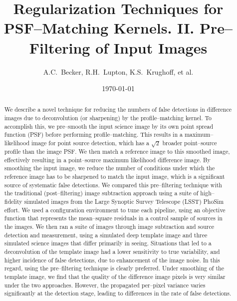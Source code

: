 \documentclass[iop]{emulateapj}
\begin{document}
\title{Regularization Techniques for PSF--Matching Kernels. II. Pre--Filtering of Input Images}

\author{
A.C.~Becker,
R.H.~Lupton,
K.S.~Krughoff,
et al.
}

\date{\today}

\begin{abstract}

We describe a novel technique for reducing the numbers of false detections in difference images due to deconvolution (or sharpening) by the profile--matching kernel.
To accomplish this, we pre--smooth the input science image by its own point spread function (PSF) before performing profile--matching.
This results in a maximum--likelihood image for point source detection, which has a $\sqrt{2}$ broader point--source profile than the image PSF.
We then match a reference image to this smoothed image, effectively resulting in a point--source maximum likelihood difference image.
By smoothing the input image, we reduce the number of conditions under which the reference image has to be sharpened to match the input image, which is a significant source of systematic false detections.
We compared this pre--filtering technique with the traditional (post--filtering) image subtraction approach using a suite of high--fidelity simulated images from the Large Synoptic Survey Telescope (LSST) PhoSim effort.
We used a configuration environment to tune each pipeline, using an objective function that represents the mean--square residuals in a control sample of sources in the images.
We then ran a suite of images through image subtraction and source detection and measurement, using a simulated deep template image and three simulated science images that differ primarily in seeing.
Situations that led to a deconvolution of the template image had a lower sensitivity to true variability, and higher incidence of false detections, due to enhancement of the image noise.
In this regard, using the pre--filtering technique is clearly preferred.
Under smoothing of the template image, we find that the quality of the difference image pixels is very similar under the two approaches.
However, the propagated per--pixel variance varies significantly at the detection stage, leading to differences in the rate of false detections.

\end{abstract}
\end{document}
